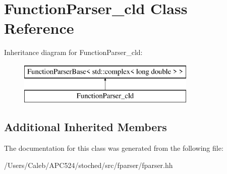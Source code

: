 \hypertarget{class_function_parser__cld}{}\section{Function\+Parser\+\_\+cld Class Reference}
\label{class_function_parser__cld}
Inheritance diagram for Function\+Parser\+\_\+cld\+:\begin{figure}[H]
\begin{center}
\leavevmode
\includegraphics[height=2.000000cm]{class_function_parser__cld}
\end{center}
\end{figure}
\subsection*{Additional Inherited Members}


The documentation for this class was generated from the following file\+:\begin{DoxyCompactItemize}
\item 
/\+Users/\+Caleb/\+A\+P\+C524/stoched/src/fparser/fparser.\+hh\end{DoxyCompactItemize}
